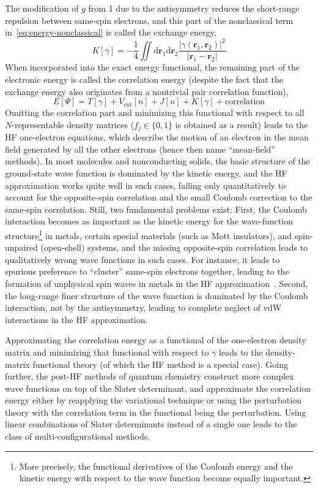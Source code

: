 The modification of $g$ from 1 due to the antisymmetry reduces the short-range repulsion between same-spin electrons, and this part of the nonclassical term in~\eqref{eq:energy-nonclassical} is called the exchange energy,
\begin{equation}
  K[\gamma]=-\frac14\iint\mathrm d\mathbf r_1\mathrm d\mathbf r_2\frac{|\gamma(\mathbf r_1,\mathbf r_2)|^2}{|\mathbf r_1-\mathbf r_2|}
\end{equation}
When incorporated into the exact energy functional, the remaining part of the electronic energy is called the correlation energy (despite the fact that the exchange energy also originates from a nontrivial pair correlation function),
\begin{equation}
  E[\Psi]=T[\gamma]+V_\text{ext}[n]+J[n]+K[\gamma]+\text{correlation}
  \label{eq:energy-with-exchange}
\end{equation}
Omitting the correlation part and minimizing this functional with respect to all $N$-representable density matrices ($f_j\in\{0,1\}$ is obtained as a result) leads to the HF one-electron equations, which describe the motion of an electron in the mean field generated by all the other electrons (hence then name ``mean-field'' methods).
In most molecules and nonconducting solids, the basic structure of the ground-state wave function is dominated by the kinetic energy, and the HF approximation works quite well in such cases, failing only quantitatively to account for the opposite-spin correlation and the small Coulomb correction to the same-spin correlation.
Still, two fundamental problems exist:
First, the Coulomb interaction becomes as important as the kinetic energy for the wave-function structure\footnote{
More precisely, the functional derivatives of the Coulomb energy and the kinetic energy with respect to the wave function become equally important.}
in metals, certain special materials (such as Mott insulators), and spin-unpaired (open-shell) systems, and the missing opposite-spin correlation leads to qualitatively wrong wave functions in such cases.
For instance, it leads to spurious preference to ``cluster'' same-spin electrons together, leading to the formation of unphysical spin waves in metals in the HF approximation~\cite{OverhauserPR62}.
Second, the long-range finer structure of the wave function is dominated by the Coulomb interaction, not by the antisymmetry, leading to complete neglect of vdW interactions in the HF approximation.

Approximating the correlation energy as a functional of the one-electron density matrix and minimizing that functional with respect to $\gamma$ leads to the density-matrix functional theory (of which the HF method is a special case).
Going further, the post-HF methods of quantum chemistry construct more complex wave functions on top of the Slater determinant, and approximate the correlation energy either by reapplying the variational technique or using the perturbation theory with the correlation term in the functional being the perturbation.
Using linear combinations of Slater determinants instead of a single one leads to the class of multi-configurational methods.

